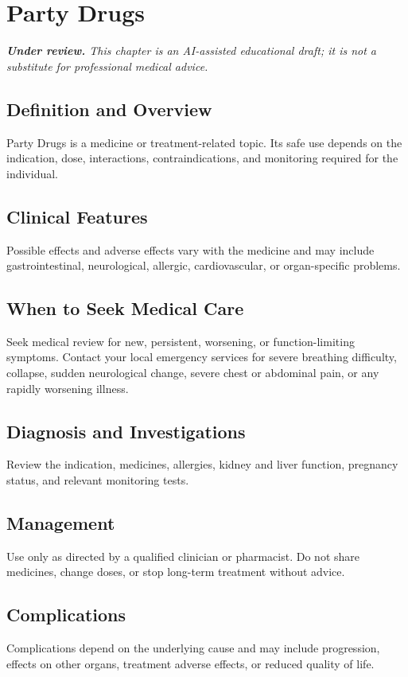 \chapter{Party Drugs}

\medskip
\noindent\textit{\textbf{Under review.} This chapter is an AI-assisted educational draft; it is not a substitute for professional medical advice.}

\section*{Definition and Overview}
Party Drugs is a medicine or treatment-related topic. Its safe use depends on the indication, dose, interactions, contraindications, and monitoring required for the individual.

\section*{Clinical Features}
Possible effects and adverse effects vary with the medicine and may include gastrointestinal, neurological, allergic, cardiovascular, or organ-specific problems.

\section*{When to Seek Medical Care}
Seek medical review for new, persistent, worsening, or function-limiting symptoms. Contact your local emergency services for severe breathing difficulty, collapse, sudden neurological change, severe chest or abdominal pain, or any rapidly worsening illness.

\section*{Diagnosis and Investigations}
Review the indication, medicines, allergies, kidney and liver function, pregnancy status, and relevant monitoring tests.

\section*{Management}
Use only as directed by a qualified clinician or pharmacist. Do not share medicines, change doses, or stop long-term treatment without advice.

\section*{Complications}
Complications depend on the underlying cause and may include progression, effects on other organs, treatment adverse effects, or reduced quality of life.

